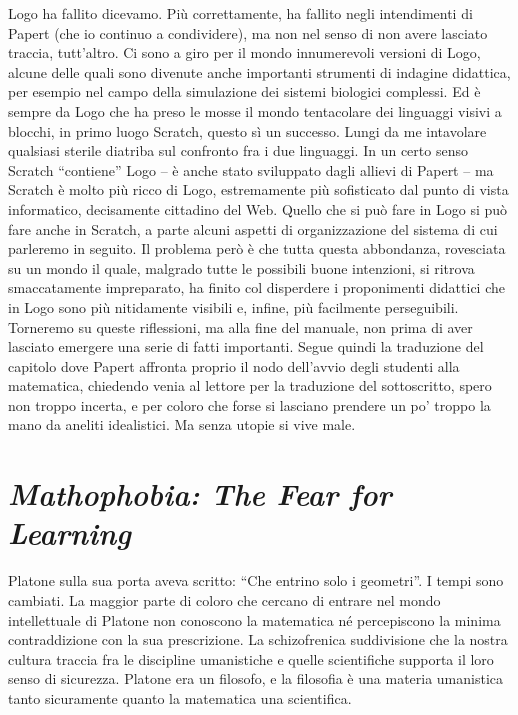 Logo ha fallito dicevamo. Più correttamente, ha fallito negli intendimenti di Papert (che io continuo a condividere), ma non nel senso di non avere lasciato traccia, tutt'altro. Ci sono a giro per il mondo  innumerevoli versioni di Logo, alcune delle quali sono divenute anche importanti strumenti di indagine didattica, per esempio nel campo della simulazione dei sistemi biologici complessi. Ed è sempre da Logo che ha preso le mosse il mondo tentacolare dei linguaggi visivi a blocchi, in primo luogo Scratch, questo sì un successo. Lungi da me intavolare qualsiasi sterile diatriba sul confronto fra i due linguaggi. In un certo senso Scratch “contiene” Logo – è anche stato sviluppato dagli allievi di Papert – ma Scratch è molto più ricco di Logo, estremamente più sofisticato dal punto di vista informatico, decisamente cittadino del Web. Quello che si può fare in Logo si può fare anche in Scratch, a parte alcuni aspetti di organizzazione del sistema di cui parleremo in seguito. Il problema però è che tutta questa abbondanza, rovesciata su un mondo il quale, malgrado tutte le possibili buone intenzioni, si ritrova smaccatamente impreparato, ha finito col disperdere i proponimenti didattici che in Logo sono più nitidamente visibili e, infine, più facilmente perseguibili. Torneremo su queste riflessioni, ma alla fine del manuale, non prima di aver lasciato emergere una serie di fatti importanti. Segue quindi la traduzione del capitolo dove Papert affronta proprio il nodo dell'avvio degli studenti alla matematica, chiedendo venia al lettore per la traduzione del sottoscritto, spero non troppo incerta, e per coloro che forse si lasciano prendere un po' troppo la mano da aneliti idealistici. Ma senza utopie si vive male.

\section{\textit{\textit{Mathophobia}: The Fear for Learning}}

Platone sulla sua porta aveva scritto: “Che entrino solo i geometri”. I tempi sono cambiati. La maggior parte di coloro che cercano di entrare nel mondo intellettuale di Platone non conoscono la matematica né percepiscono la minima contraddizione con la sua prescrizione. La schizofrenica suddivisione che la nostra cultura traccia fra le discipline umanistiche e quelle scientifiche supporta il loro senso di sicurezza. Platone era un filosofo, e la filosofia è una materia umanistica tanto sicuramente quanto la matematica una scientifica.

